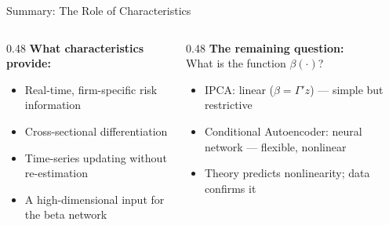 \documentclass[aspectratio=169, 10pt]{beamer}
\begin{document}
\begin{frame}{Summary: The Role of Characteristics}
\begin{columns}
\begin{column}{0.48\textwidth}
  \textbf{What characteristics provide:}
  \begin{itemize}
    \item Real-time, firm-specific risk information
    \item Cross-sectional differentiation
    \item Time-series updating without re-estimation
    \item A high-dimensional input for the beta network
  \end{itemize}
\end{column}
\begin{column}{0.48\textwidth}
  \textbf{The remaining question:}\\
  What is the function $\beta(\cdot)$?
  \begin{itemize}
    \item IPCA: linear ($\beta = \Gamma'z$) — simple but restrictive
    \item Conditional Autoencoder: neural network — flexible, nonlinear
    \item Theory predicts nonlinearity; data confirms it
  \end{itemize}
\end{column}
\end{columns}

\end{frame}
\end{document}
